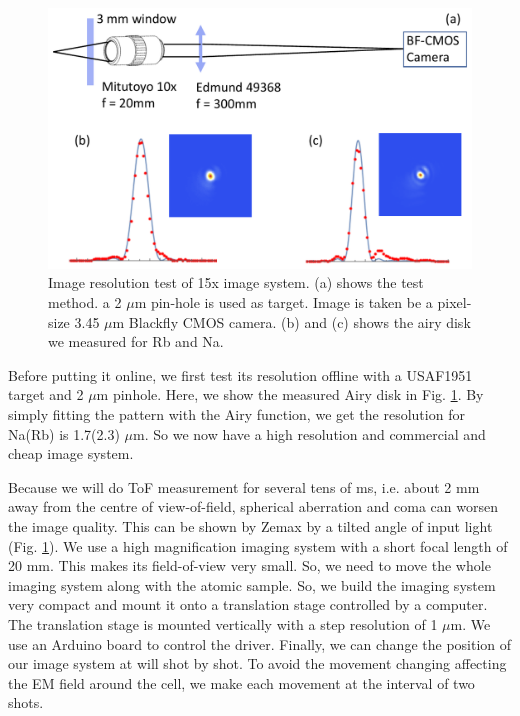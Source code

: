 \begin{figure}[htb]
\begin{center}
\includegraphics[width = 0.9\linewidth]{figures/Apparatus_image-reso.pdf}
\end{center}
\caption[Image resolution test of 15x image system]{Image resolution test of 15x image system. (a) shows the test method. a 2 $\mu$m pin-hole is used as target. Image is taken be a pixel-size 3.45 $\mu$m Blackfly CMOS camera. (b) and (c) shows the airy disk we measured for Rb and Na.}
\label{image_reso}
\end{figure}

Before putting it online, we first test its resolution offline with a USAF1951 target and 2 $\mu$m pinhole. Here, we show the measured Airy disk in Fig. \ref{image_reso}. By simply fitting the pattern with the Airy function, we get the resolution for Na(Rb) is 1.7(2.3) $\mu$m. So we now have a high resolution and commercial and cheap image system. 

Because we will do ToF measurement for several tens of ms, i.e. about 2 mm away from the centre of view-of-field, spherical aberration and coma can worsen the image quality. This can be shown by Zemax by a tilted angle of input light (Fig. \ref{image_reso}). We use a high magnification imaging system with a short focal length of 20 mm. This makes its field-of-view very small. So, we need to move the whole imaging system along with the atomic sample. So, we build the imaging system very compact and mount it onto a translation stage controlled by a computer. The translation stage is mounted vertically with a step resolution of 1 $\mu$m. We use an Arduino board to control the driver. Finally, we can change the position of our image system at will shot by shot. To avoid the movement changing affecting the EM field around the cell, we make each movement at the interval of two shots.

